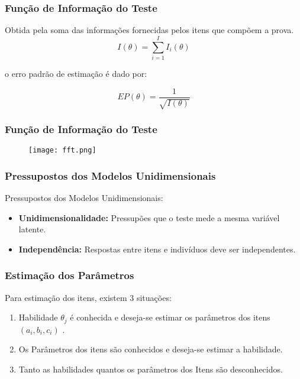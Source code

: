 \documentclass{beamer}
\begin{document}
	\begin{frame}
			
			\frametitle{Função de Informação do Teste}
		
		Obtida pela soma das informações fornecidas pelos itens que compõem a prova.	
			\[
			I(\theta) = \sum_{i=1}^{I}I_i(\theta)
			\]
	
		o erro padrão de estimação é dado por:
			
			\[
			EP(\theta) = \dfrac{1}{\sqrt{I(\theta)}}
			\]
			
	\end{frame}	
		
		
	\begin{frame}
		
		\frametitle{Função de Informação do Teste}

		\begin{figure}
			\texttt{[image: fft.png]}
		\end{figure}
		
	
	
		
		
		
	\end{frame}
	
	\begin{frame}
		
		\frametitle{Pressupostos dos Modelos Unidimensionais}
		\begin{center}
			Pressupostos dos Modelos Unidimensionais:
		\end{center}
		\begin{itemize}
			\item<1-> \textbf{Unidimensionalidade:} Pressupões que o teste mede a mesma variável latente.
			
			\item<1-> \textbf{Independência:} Respostas entre itens e indivíduos deve ser independentes.
	
		\end{itemize}
		
	\end{frame}
	
	\begin{frame}
		
		\frametitle{Estimação dos Parâmetros}
		\begin{center}
			Para estimação dos itens, existem 3 situações:
		\end{center}
		\begin{enumerate}
			\item<1-> Habilidade $\theta_j$ é conhecida e deseja-se estimar os parâmetros dos itens
			$ (a_i, b_i, c_i) $ .
			
			\item<1-> Os Parâmetros dos itens são conhecidos e deseja-se estimar a habilidade.
			
			\item<1-> Tanto as habilidades quantos os parâmetros dos Itens são desconhecidos.
		\end{enumerate}
		
	\end{frame}
	
\end{document}
